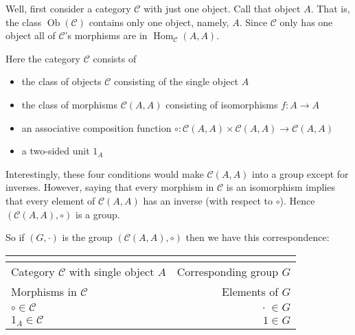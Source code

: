 \documentclass{article}
\theoremstyle{definition}
\begin{document}
\bigskip
\noindent
Well, first consider a category $\mathcal{C}$ with just one
object. Call that object $A$. That is, the class
$\operatorname{Ob}(\mathcal{C})$ contains only one object,
namely, $A$. Since $\mathcal{C}$ only has one object all of
$\mathcal{C}$'s morphisms are in
$\operatorname{Hom}_{\mathcal{C}} (A,A)$.


\bigskip
\noindent
Here the category $\mathcal{C}$ consists of

\begin{itemize}
  \item the class of objects $\mathcal{C}$ consisting of the single object $A$ 
  \item the class of morphisms $\mathcal{C}(A,A)$ consisting of isomorphisms $f: A \to A$
  \item an associative composition function $\circ:
        \mathcal{C}(A,A) \times \mathcal{C}(A,A) \to
        \mathcal{C}(A,A)$  
  \item a two-sided unit $1_{A}$
\end{itemize}

\medskip
\noindent
Interestingly, these four conditions would make
$\mathcal{C}(A,A)$ into a group except for inverses. However,
saying that every morphism in $\mathcal{C}$ is an isomorphism
implies that every element of $\mathcal{C}(A,A)$ has an inverse
(with respect to $\circ$). Hence $(\mathcal{C}(A,A), \circ)$ is a
group.

\bigskip
\noindent
So if $(G,\cdot)$ is the group $(\mathcal{C}(A,A),\circ)$ then we
have this correspondence:

\begin{center}
  \begin{table}[H]
    \begin{tabular}{l|r}
      \multicolumn{1}{c}{\centering {\bf Category}} & \multicolumn{1}{c}{\centering {\bf Group}} \\ 
      \hline\hline
      Category $\mathcal{C}$ with single object $A$ & Corresponding group $G$ \\
      Morphisms in $\mathcal{C}$                    & Elements of $G$ \\
      $\circ \in \mathcal{C}$                       & $\cdot \; \in G$ \\
      $1_{A} \in \mathcal{C}$                       & $1 \in G$ \\
      \hline \hline
    \end{tabular}
   \end{table}
\end{center}
\end{document}
